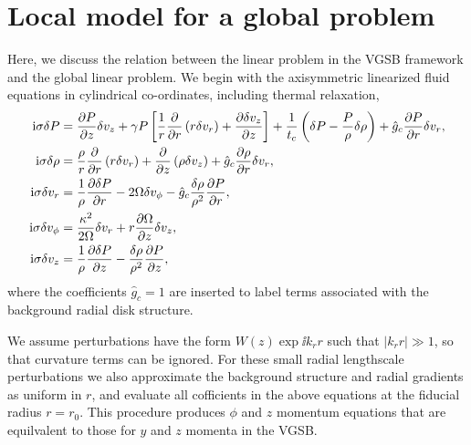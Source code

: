 \section{Local model for a global problem}\label{global_corr}
Here, we discuss the relation between the linear problem in the
VGSB framework and the global linear problem. We begin with the
axisymmetric linearized fluid equations in cylindrical co-ordinates, including
thermal relaxation, 
\begin{align}
\mathrm{i}\sigma\delta P &=\frac{\partial P}{\partial z}\delta v_z + \gamma P
\left[\frac{1}{r}\frac{\partial}{\partial r}\left(r\delta v_r\right) + \frac{\partial
    \delta v_z}{\partial z}\right] + \frac{1}{t_c}\left(\delta P -
  \frac{P}{\rho}\delta\rho\right) + \hat{g}_c \frac{\partial P}{\partial r}\delta v_r,\\
  \mathrm{i}\sigma\delta\rho &= \frac{\rho}{r}\frac{\partial}{\partial r}\left(r\delta v_r\right) + \frac{\partial}{\partial
  z}\left(\rho\delta v_z\right)  + \hat{g}_c\frac{\partial\rho}{\partial r}\delta v_r,\\
\mathrm{i}\sigma\delta v_r &= \frac{1}{\rho}\frac{\partial\delta P}{\partial r} - 2\Omega
\delta v_\phi - \hat{g}_c\frac{\delta\rho}{\rho^2}\frac{\partial P}{\partial r},\\ 
\mathrm{i}\sigma\delta v_\phi  &= \frac{\kappa^2}{2\Omega}\delta v_r +
r\frac{\partial\Omega}{\partial z}\delta v_z,\\
\mathrm{i} \sigma\delta v_z &= \frac{1}{\rho}\frac{\partial\delta P}{\partial z} -
\frac{\delta \rho}{\rho^2}\frac{\partial P}{\partial z},
\end{align}
where the coefficients $\hat{g}_c=1$ are inserted to label terms
associated with the background radial disk structure. 

We assume perturbations have the form $W(z)\exp{\ii k_r r}$ such
that $|k_rr|\gg1$, so that curvature terms can be ignored. For these
small radial lengthscale perturbations we also approximate the
background structure and radial gradients as uniform in $r$, and
evaluate all cofficients in the above equations at the fiducial radius
$r=r_0$. This procedure produces $\phi$ and $z$ momentum equations
that are equilvalent to those for $y$ and $z$ momenta in the VGSB. 

